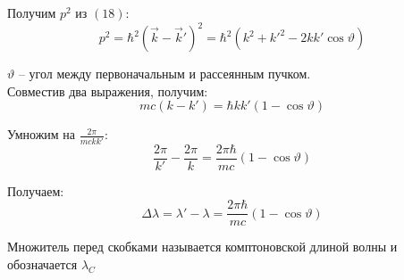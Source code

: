 \documentclass{article}
\begin{document}
	Получим $p^2$ из $(18)$:
	\begin{equation}
		p^2 = \hbar^2(\vec k - \vec k')^2 = \hbar^2(k^2+k'^2-2kk'\cos\vartheta)
	\end{equation}

	$\vartheta$ -- угол между первоначальным и рассеянным пучком.\\

	Совместив два выражения, получим:
	\begin{equation}
		mc(k-k') = \hbar k k'(1-\cos\vartheta)
	\end{equation}

	Умножим на $\frac{2\pi}{mckk'}$:
	\begin{equation}
		\frac{2\pi}{k'}-\frac{2\pi}{k}=\frac{2\pi\hbar}{mc}(1-\cos\vartheta)
	\end{equation}

	Получаем:
	\begin{equation}
		\Delta\lambda = \lambda' - \lambda = \frac{2\pi\hbar}{mc}(1-\cos\vartheta)
	\end{equation}

	Множитель перед скобками называется комптоновской длиной волны и обозначается $\lambda_C$
	
\end{document}
